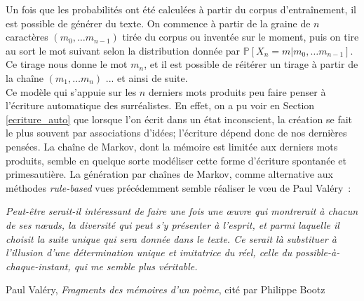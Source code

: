 \documentclass{article}
\newenvironment{citationbox}
{\begin{center}
		\begin{minipage}{.8\textwidth}
		}
		{
		\end{minipage}	
\end{center}
}
\begin{document}
				Un fois que les probabilités ont été calculées à partir du corpus d'entraînement, il est possible de générer du texte. On commence à partir de la graine de $n$ caractères $(m_0, \dots m_{n-1})$ tirée du corpus ou inventée sur le moment, puis on tire au sort le mot suivant selon la distribution donnée par $\mathbb{P}[X_n = m| m_0, \dots m_{n-1}]$. Ce tirage nous donne le mot $m_n$, et il est possible de réitérer un tirage à partir de la chaîne $(m_1, \dots m_n)$ ... et ainsi de suite.\\
				
				Ce modèle qui s'appuie sur les $n$ derniers mots produits peu faire penser à l'écriture automatique des surréalistes. En effet, on a pu voir en Section \ref{ecriture_auto} que lorsque l'on écrit dans un état inconscient, la création se fait le plus souvent par associations d'idées; l'écriture dépend donc de nos dernières pensées. La chaîne de Markov, dont la mémoire est limitée aux derniers mots produits, semble en quelque sorte modéliser cette forme d'écriture spontanée et primesautière. La génération par chaînes de Markov, comme alternative aux méthodes \textit{rule-based} vues précédemment semble réaliser le vœu de Paul Valéry~:
				\begin{citationbox}
					\textit{Peut-être serait-il intéressant de faire une fois une œuvre qui montrerait à chacun de ses nœuds, la diversité qui peut s’y présenter à l’esprit, et parmi laquelle il choisit la suite unique qui sera donnée dans le texte. Ce serait là substituer à l’illusion d’une détermination unique et imitatrice du réel, celle du possible-à-chaque-instant, qui me semble plus véritable.} 
					\begin{flushleft}
						Paul Valéry, \textit{Fragments des mémoires d'un poème}, cité par Philippe Bootz \cite{bootz2012}
					\end{flushleft}
				\end{citationbox}
				
				
\end{document}
